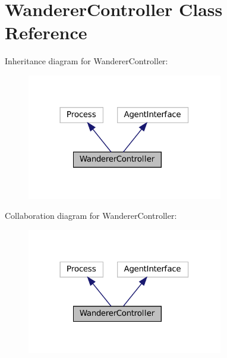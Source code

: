 \hypertarget{classWandererController}{}\section{Wanderer\+Controller Class Reference}
\label{classWandererController}


Inheritance diagram for Wanderer\+Controller\+:
\nopagebreak
\begin{figure}[H]
\begin{center}
\leavevmode
\includegraphics[width=242pt]{classWandererController__inherit__graph}
\end{center}
\end{figure}


Collaboration diagram for Wanderer\+Controller\+:
\nopagebreak
\begin{figure}[H]
\begin{center}
\leavevmode
\includegraphics[width=242pt]{classWandererController__coll__graph}
\end{center}
\end{figure}
